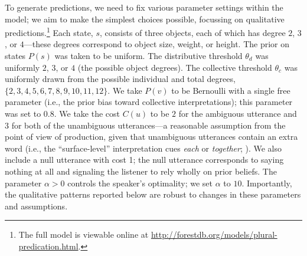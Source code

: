 \documentclass[preprint,12pt,authoryear,titlepage]{elsarticle}
\newcommand{\ndg}[1]{\textcolor{Green}{[ndg: #1]}}
\begin{document}

To generate predictions, we need to fix various parameter settings within the model; we aim to make the simplest choices possible, focussing on qualitative predictions.\footnote{The full model is viewable online at \url{http://forestdb.org/models/plural-predication.html}.} %
Each state, $s$, consists of three objects, each of which has degree $2$, $3$, or $4$---these degrees correspond to object size, weight, or height. The prior on states $P(s)$ was taken to be uniform. The distributive threshold $\theta_d$ was uniformly $2$, $3$, or $4$ (the possible object degrees). The collective threshold $\theta_c$ was uniformly drawn from the possible individual and total degrees, $\{2, 3, 4, 5, 6, 7, 8, 9,10,11,12\}$. %
We take $P(v)$ to be Bernoulli with a single free parameter (i.e., the prior bias toward collective interpretations); this parameter was set to $0.8$. 
We take the cost $C(u)$ to be $2$ for the ambiguous utterance and $3$ for both of the unambiguous utterances---a reasonable assumption from the point of view of production, given that unambiguous utterances contain an extra word (i.e., the ``surface-level'' interpretation cues \emph{each} or \emph{together}; \citealp{syrettmusolino2016}). We also include a null utterance with cost 1; the null utterance corresponds to saying nothing at all and signaling the listener to rely wholly on prior beliefs. The parameter $\alpha > 0$ controls the speaker's optimality; we set $\alpha$ to $10$. 
Importantly, the qualitative patterns reported below are robust to changes in these parameters and assumptions.

\end{document}
